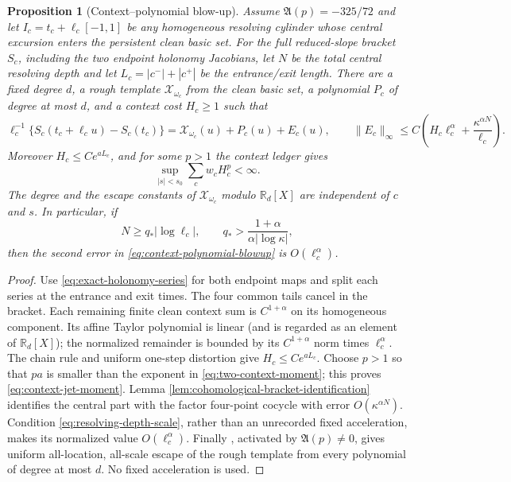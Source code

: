 \documentclass[11pt]{article}
\newtheorem{proposition}[theorem]{Proposition}
\begin{document}
\begin{proposition}[Context--polynomial blow-up]
\label{prop:context-polynomial-blowup}
Assume $\mathfrak A(p)=-325/72$ and let
$I_c=t_c+\ell_c[-1,1]$ be any homogeneous
resolving cylinder whose central excursion enters the persistent clean basic
set.  For the full reduced-slope bracket $S_c$, including the two endpoint
holonomy Jacobians, let $N$ be the total central resolving depth and let
$L_c=|c^-|+|c^+|$ be the entrance/exit length.  There are a fixed degree $d$,
a rough template $\mathcal X_{\omega_c}$ from the clean basic set, a
polynomial $P_c$ of degree at most $d$, and a context cost $H_c\ge1$ such that
\begin{equation}
\label{eq:context-polynomial-blowup}
 \ell_c^{-1}\{S_c(t_c+\ell_c u)-S_c(t_c)\}
 =\mathcal X_{\omega_c}(u)+P_c(u)+E_c(u),\qquad
 \|E_c\|_\infty\le C\left(H_c\ell_c^\alpha+
       \frac{\kappa^{\alpha N}}{\ell_c}\right).
\end{equation}
Moreover $H_c\le Ce^{aL_c}$, and for some $p>1$ the context ledger gives
\begin{equation}
\label{eq:context-jet-moment}
 \sup_{|s|<s_0}\sum_c w_c H_c^p<\infty .
\end{equation}
The degree and the escape constants of $\mathcal X_{\omega_c}$ modulo
$\mathbb R_d[X]$ are independent of $c$ and $s$.  In particular, if
\begin{equation}
\label{eq:resolving-depth-scale}
 N\ge q_*|\log\ell_c|,
 \qquad q_*>\frac{1+\alpha}{\alpha|\log\kappa|},
\end{equation}
then the second error in \eqref{eq:context-polynomial-blowup} is
$O(\ell_c^\alpha)$.
\end{proposition}

\begin{proof}
Use \eqref{eq:exact-holonomy-series} for both endpoint maps and split each
series at the entrance and exit times.  The four common tails cancel in the
bracket.  Each remaining finite clean context sum is $C^{1+\alpha}$ on its
homogeneous component.  Its affine Taylor polynomial is linear (and is
regarded as an element of $\mathbb R_d[X]$); the normalized remainder is
bounded by its $C^{1+\alpha}$ norm times $\ell_c^\alpha$.  The chain rule and
uniform one-step distortion give $H_c\le Ce^{aL_c}$.  Choose $p>1$ so that
$pa$ is smaller than the exponent in \eqref{eq:two-context-moment}; this proves
\eqref{eq:context-jet-moment}.  Lemma
\ref{lem:cohomological-bracket-identification} identifies the central part
with the factor four-point cocycle with error $O(\kappa^{\alpha N})$.
Condition \eqref{eq:resolving-depth-scale}, rather than an unrecorded fixed
acceleration, makes its normalized value $O(\ell_c^\alpha)$.  Finally
\cite[Propositions~4.31--4.32]{Leclerc2026}, activated by
$\mathfrak A(p)\ne0$, gives uniform all-location, all-scale escape of the rough
template from every polynomial of degree at most $d$.  No fixed acceleration
is used.
\end{proof}
\end{document}
